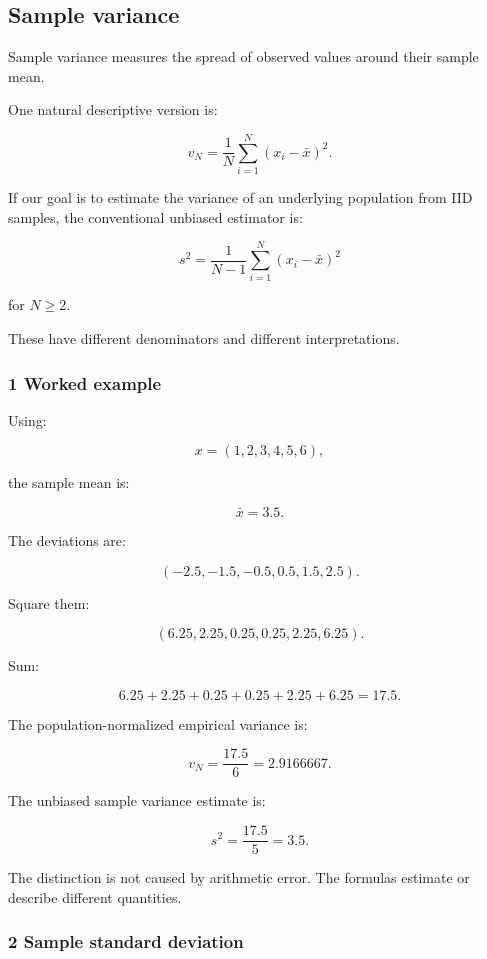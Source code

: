 \subsection{Sample variance}\label{02-foundations-ii-ch030-sample-variance}

Sample variance measures the spread of observed values around their sample mean.

One natural descriptive version is:

\[
 \boxed{ v_N= \frac1N \sum_{i=1}^{N}(x_i-\bar x)^2 }.
\]

If our goal is to estimate the variance of an underlying population from IID samples, the conventional unbiased estimator is:

\[
 \boxed{ s^2= \frac1{N-1} \sum_{i=1}^{N}(x_i-\bar x)^2 }
\]

for \(N\ge2\).

These have different denominators and different interpretations.

\subsubsection{1 Worked example}\label{02-foundations-ii-ch030-worked-example}

Using:

\[
 x=(1,2,3,4,5,6),
\]

the sample mean is:

\[
 \bar x=3.5.
\]

The deviations are:

\[
 (-2.5,-1.5,-0.5,0.5,1.5,2.5).
\]

Square them:

\[
 (6.25,2.25,0.25,0.25,2.25,6.25).
\]

Sum:

\[
 6.25+2.25+0.25+0.25+2.25+6.25 =\boxed{17.5}.
\]

The population-normalized empirical variance is:

\[
 v_N=\frac{17.5}{6} =\boxed{2.9166667}.
\]

The unbiased sample variance estimate is:

\[
 s^2=\frac{17.5}{5} =\boxed{3.5}.
\]

The distinction is not caused by arithmetic error. The formulas estimate or describe different quantities.

\subsubsection{2 Sample standard deviation}\label{02-foundations-ii-ch030-sample-standard-deviation}

